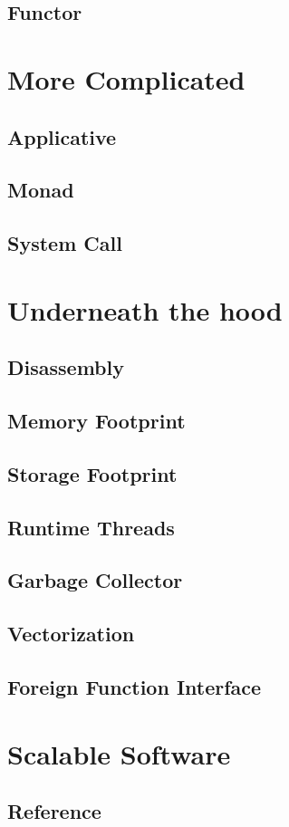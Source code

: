 \documentclass{kdp}
\begin{document}
\chapter{Functor}

\part{More Complicated}

\chapter{Applicative}

\chapter{Monad}

\chapter{System Call}

\part{Underneath the hood}

\chapter{Disassembly}

\chapter{Memory Footprint}

\chapter{Storage Footprint}

\chapter{Runtime Threads}

\chapter{Garbage Collector}

\chapter{Vectorization}

\chapter{Foreign Function Interface}

\part{Scalable Software}

\chapter{Reference}
\end{document}
